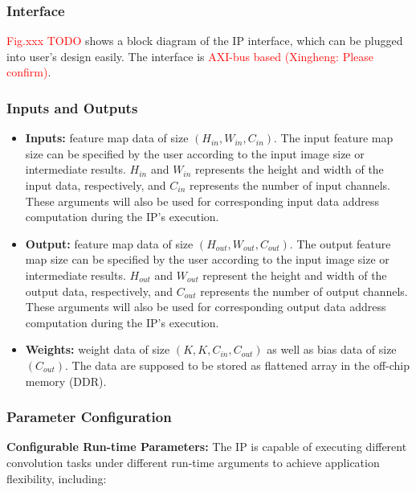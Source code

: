 \documentclass[a4paper, 11pt]{article}
\begin{document}
\subsubsection{Interface}

\textcolor{red}{Fig.xxx TODO} shows a block diagram of the IP interface, which can be plugged into user's design easily.
The interface is \textcolor{red}{AXI-bus based (Xingheng: Please confirm)}.



\subsubsection{Inputs and Outputs}

\begin{itemize}
\item {
\textbf{Inputs:} feature map data of size $(H_{in}, W_{in}, C_{in})$.
The input feature map size can be specified by the user according to the input image size or intermediate results. $H_{in}$ and $W_{in}$ represents the height and width of the input data, respectively, and $C_{in}$ represents the number of input channels. These arguments will also be used for corresponding input data address computation during the IP's execution.
}
\item {
\textbf{Output:} feature map data of size $(H_{out}, W_{out}, C_{out})$.
The output feature map size can be specified by the user according to the input image size or intermediate results. $H_{out}$ and $W_{out}$ represent the height and width of the output data, respectively, and $C_{out}$ represents the number of output channels. These arguments will also be used for corresponding output data address computation during the IP's execution.
}
\item {
\textbf{Weights:} weight data of size $(K, K, C_{in}, C_{out})$ as well as bias data of size $( C_{out})$. The data are supposed to be stored as flattened array in the off-chip memory (DDR).
}
\end{itemize}


\subsubsection{Parameter Configuration}


\quad
\textbf{Configurable Run-time Parameters:}
The IP is capable of executing different convolution tasks under different run-time arguments to achieve application flexibility, including:
\end{document}
